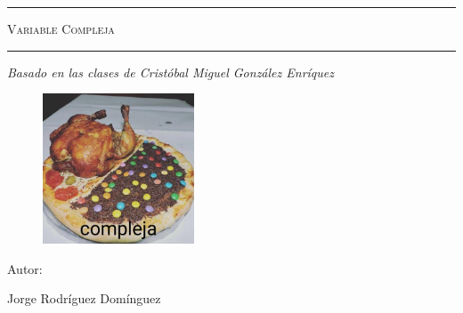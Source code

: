 \begin{titlepage}
\centering
{\bfseries\LARGE \ \par}
\vspace{1cm}
{\scshape\Large \ \par}
\vspace{3cm}
\rule{\linewidth}{0.5mm}
{\scshape\Huge Variable Compleja \par}
\rule{\linewidth}{0.5mm} \par
\vspace{3cm}
{\itshape\Large Basado en las clases de Cristóbal Miguel González Enríquez \par}
\vfill
\begin{figure}[H]
    \centering
    \includegraphics[width=0.4\textwidth]{complejaxd.jpeg}
\end{figure}
{\Large Autor: \par}
{\Large Jorge Rodríguez Domínguez \par}
\vfill
\end{titlepage}
\tableofcontents